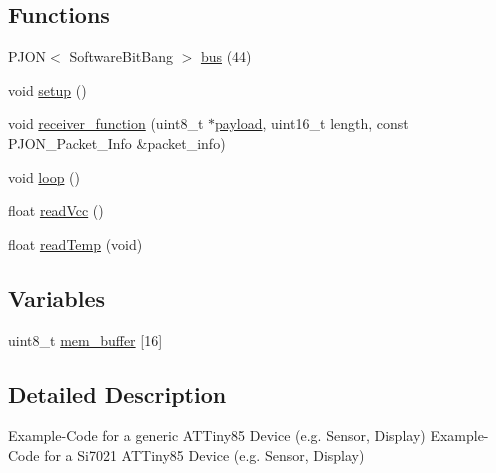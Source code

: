 \subsection*{Functions}
\begin{DoxyCompactItemize}
\item 
P\-J\-O\-N$<$ Software\-Bit\-Bang $>$ \hyperlink{ATTINY_2Local_2SoftwareBitBang_2DeviceGeneric_2DeviceGeneric_8ino_a538cbe881a4c2d02f3bd441059c41ec4}{bus} (44)
\item 
void \hyperlink{ATTINY_2Local_2SoftwareBitBang_2DeviceGeneric_2DeviceGeneric_8ino_a4fc01d736fe50cf5b977f755b675f11d}{setup} ()
\item 
void \hyperlink{ATTINY_2Local_2SoftwareBitBang_2DeviceGeneric_2DeviceGeneric_8ino_a76fc5e73c141f748dcc1809fdcfa1714}{receiver\-\_\-function} (uint8\-\_\-t $\ast$\hyperlink{Uno__Dragino__LoRa__GPS__Shield__TTN_8ino_a78a402d1762842473567de90b11ed256}{payload}, uint16\-\_\-t length, const P\-J\-O\-N\-\_\-\-Packet\-\_\-\-Info \&packet\-\_\-info)
\item 
void \hyperlink{ATTINY_2Local_2SoftwareBitBang_2DeviceGeneric_2DeviceGeneric_8ino_afe461d27b9c48d5921c00d521181f12f}{loop} ()
\item 
float \hyperlink{ATTINY_2Local_2SoftwareBitBang_2DeviceGeneric_2DeviceGeneric_8ino_a0b3195c3893f02cb1b80d878b89549d6}{read\-Vcc} ()
\item 
float \hyperlink{ATTINY_2Local_2SoftwareBitBang_2DeviceGeneric_2DeviceGeneric_8ino_ada109bb0cdc12131465dfe7a74f93b1e}{read\-Temp} (void)
\end{DoxyCompactItemize}
\subsection*{Variables}
\begin{DoxyCompactItemize}
\item 
uint8\-\_\-t \hyperlink{ATTINY_2Local_2SoftwareBitBang_2DeviceGeneric_2DeviceGeneric_8ino_ae2662dd0517ccab4cb98d64fedd7eec6}{mem\-\_\-buffer} \mbox{[}16\mbox{]}
\end{DoxyCompactItemize}


\subsection{Detailed Description}
Example-\/\-Code for a generic A\-T\-Tiny85 Device (e.\-g. Sensor, Display) Example-\/\-Code for a Si7021 A\-T\-Tiny85 Device (e.\-g. Sensor, Display)

